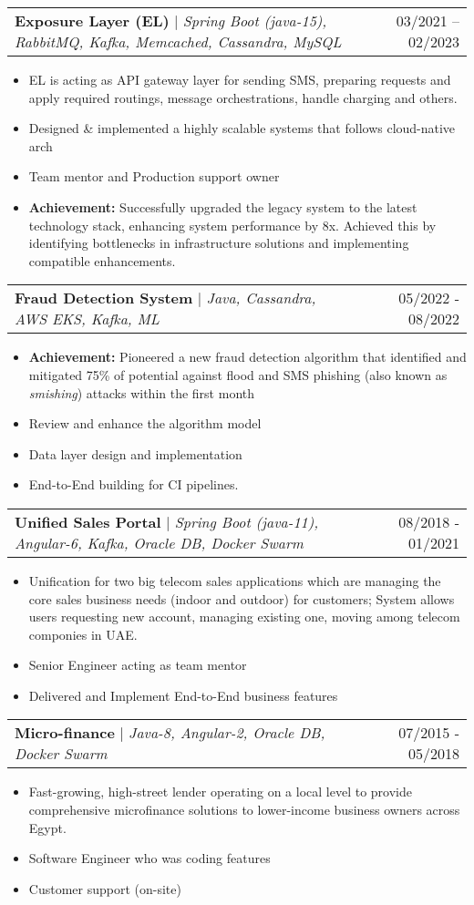 \documentclass[letterpaper,11pt]{article}
\makeatletter
\newcommand{\resumeItem}[1]{
  \item\small{
    {#1 \vspace{-2pt}}
  }
}
\newcommand{\resumeProjectHeading}[2]{
    \item
    \begin{tabular*}{0.97\textwidth}{l@{\extracolsep{\fill}}r}
      \small#1 & #2 \\
    \end{tabular*}\vspace{-7pt}
}
\newcommand{\resumeItemListStart}{\begin{itemize}}
\newcommand{\resumeItemListEnd}{\end{itemize}\vspace{-5pt}}
\makeatother
\begin{document}
        \resumeProjectHeading
        {\textbf{Exposure Layer (EL)} $|$ \footnotesize\emph{Spring Boot (java-15), RabbitMQ, Kafka, Memcached, Cassandra, MySQL}}
        {03/2021 -- 02/2023}
        \resumeItemListStart
            \resumeItem{EL is acting as API gateway layer for sending SMS, preparing requests and apply required routings, message orchestrations, handle charging and others.}
            \resumeItem{Designed \& implemented a highly scalable systems that follows cloud-native arch}
            \resumeItem{Team mentor and Production support owner}
            \resumeItem{\textbf{Achievement:} Successfully upgraded the legacy system to the latest technology stack, enhancing system performance by 8x. Achieved this by identifying bottlenecks in infrastructure solutions and implementing compatible enhancements. }
          \resumeItemListEnd
          
      \resumeProjectHeading
        {\textbf{Fraud Detection System} $|$ \footnotesize\emph{Java, Cassandra, AWS EKS, Kafka, ML}}{05/2022 - 08/2022}
        \resumeItemListStart
            \resumeItem{\textbf{Achievement:} Pioneered a new fraud detection algorithm that identified and mitigated 75\% of potential against flood and SMS phishing (also known as \textit{smishing}) attacks within the first month}
            \resumeItem{Review and enhance the algorithm model}
            \resumeItem{Data layer design and implementation}
            \resumeItem{End-to-End building for CI pipelines.}
        \resumeItemListEnd

      \resumeProjectHeading
        {\textbf{Unified Sales Portal} $|$ \footnotesize\emph{Spring Boot (java-11), Angular-6, Kafka, Oracle DB, Docker Swarm}}
        {08/2018 - 01/2021}
        \resumeItemListStart
            \resumeItem{Unification for two big telecom sales applications which are managing the core sales business needs (indoor and outdoor) for customers; System allows users requesting new account, managing existing one, moving among telecom componies in UAE.}
            \resumeItem{Senior Engineer acting as team mentor}
            \resumeItem{Delivered and Implement End-to-End business features}
        \resumeItemListEnd
	
      \resumeProjectHeading
        {\textbf{Micro-finance} $|$ \footnotesize\emph{Java-8, Angular-2, Oracle DB, Docker Swarm}}
        {07/2015 - 05/2018}
        \resumeItemListStart
            \resumeItem{Fast-growing, high-street lender operating on a local level to provide comprehensive microfinance solutions to lower-income business owners across Egypt.}
            \resumeItem{Software Engineer who was coding features}
            \resumeItem{Customer support (on-site)}
        \resumeItemListEnd
          
\end{document}
